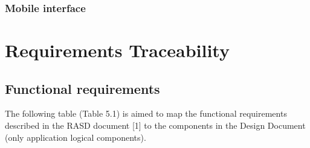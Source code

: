 \documentclass{article}
\begin{document}
	\subsubsection{Mobile interface}


	\section{Requirements Traceability}

	\subsection{Functional requirements}
	The following table (Table 5.1) is aimed to map the functional requirements described in the RASD document [1] to the components in the Design Document (only application logical components).
\end{document}
